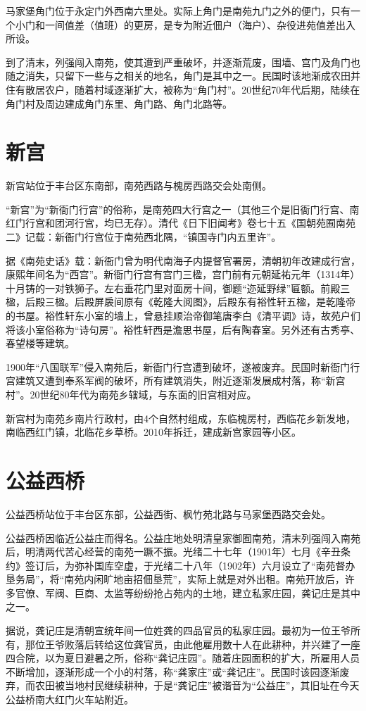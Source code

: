 马家堡角门位于永定门外西南六里处。实际上角门是南苑九门之外的便门，只有一个小门和一间值差（值班）的更房，是专为附近佃户（海户）、杂役进苑值差出入所设。

到了清末，列强闯入南苑，使其遭到严重破坏，并逐渐荒废，围墙、宫门及角门也随之消失，只留下一些与之相关的地名，角门是其中之一。民国时该地渐成农田并住有散居农户，随着村域逐渐扩大，被称为“角门村”。20世纪70年代后期，陆续在角门村及周边建成角门东里、角门路、角门北路等。

\section{新宫}
新宫站位于丰台区东南部，南苑西路与槐房西路交会处南侧。

“新宫”为“新衙门行宫”的俗称，是南苑四大行宫之一（其他三个是旧衙门行宫、南红门行宫和团河行宫，均已无存）。清代《日下旧闻考》卷七十五《国朝苑囿南苑二》记载：新衙门行宫位于南苑西北隅，“镇国寺门内五里许”。

据《南苑史话》载：新衙门曾为明代南海子内提督官署房，清朝初年改建成行宫，康熙年间名为“西宫”。新衙门行宫有宫门三楹，宫门前有元朝延祐元年（1314年）十月铸的一对铁狮子。左右垂花门里对面房十间，御题“迩延野绿”匾额。前殿三楹，后殿三楹。后殿屏扆间原有《乾隆大阅图》，后殿东有裕性轩五楹，是乾隆帝的书屋。裕性轩东小室的墙上，曾悬挂顺治帝御笔唐李白《清平调》诗，故苑户们将该小室俗称为“诗句房”。裕性轩西是澹思书屋，后有陶春室。另外还有古秀亭、春望楼等建筑。

1900年“八国联军”侵入南苑后，新衙门行宫遭到破坏，遂被废弃。民国时新衙门行宫建筑又遭到奉系军阀的破坏，所有建筑消失，附近逐渐发展成村落，称“新宫村”。20世纪80年代为南苑乡辖域，与东面的旧宫相对应。

新宫村为南苑乡南片行政村，由4个自然村组成，东临槐房村，西临花乡新发地，南临西红门镇，北临花乡草桥。2010年拆迁，建成新宫家园等小区。

\section{公益西桥}
公益西桥站位于丰台区东部，公益西街、枫竹苑北路与马家堡西路交会处。

公益西桥因临近公益庄而得名。公益庄地处明清皇家御囿南苑，清末列强闯入南苑后，明清两代苦心经营的南苑一蹶不振。光绪二十七年（1901年）七月《辛丑条约》签订后，为弥补国库空虚，于光绪二十八年（1902年）六月设立了“南苑督办垦务局”，将“南苑内闲旷地亩招佃垦荒”，实际上就是对外出租。南苑开放后，许多官僚、军阀、巨商、太监等纷纷抢占苑内的土地，建立私家庄园，龚记庄是其中之一。

据说，龚记庄是清朝宣统年间一位姓龚的四品官员的私家庄园。最初为一位王爷所有，那位王爷败落后转给这位龚官员，由此他雇用数十人在此耕种，并兴建了一座四合院，以为夏日避暑之所，俗称“龚记庄园”。随着庄园面积的扩大，所雇用人员不断增加，逐渐形成一个小的村落，称“龚家庄”或“龚记庄”。民国时该园逐渐废弃，而农田被当地村民继续耕种，于是“龚记庄”被谐音为“公益庄”，其旧址在今天公益桥南大红门火车站附近。

